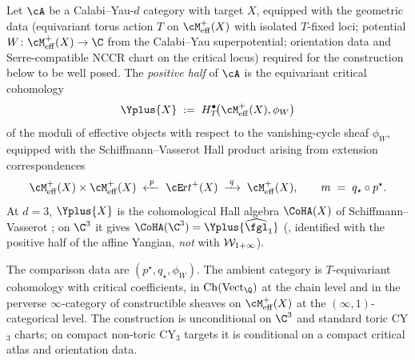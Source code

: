 \begin{definition}
Let $\cA$ be a Calabi--Yau-$d$ category with target $X$, equipped with
the geometric data \textup{(}equivariant torus action $T$ on
$\cM^+_{\mathrm{eff}}(X)$ with isolated $T$-fixed loci; potential $W
\colon \cM^+_{\mathrm{eff}}(X) \to \C$ from the Calabi--Yau
superpotential; orientation data and Serre-compatible NCCR chart on the
critical locus\textup{)} required for the construction below to be
well posed. The \emph{positive half} of $\cA$ is the equivariant
critical cohomology
\[
 \Yplus{X} \;:=\; H^\bullet_{T}\!\bigl(\cM^+_{\mathrm{eff}}(X),
 \phi_W\bigr)
\]
of the moduli of effective objects with respect to the vanishing-cycle
sheaf $\phi_W$, equipped with the Schiffmann--Vasserot Hall product
arising from extension correspondences
\[
 \cM^+_{\mathrm{eff}}(X) \times \cM^+_{\mathrm{eff}}(X)
 \;\xleftarrow{\;p\;}\;
 \cE\!xt^+(X)
 \;\xrightarrow{\;q\;}\;
 \cM^+_{\mathrm{eff}}(X),
 \qquad
 m \;=\; q_\star \circ p^\star.
\]
At $d = 3$, $\Yplus{X}$ is the cohomological Hall algebra
$\CoHA(X)$ of Schiffmann--Vasserot \cite{SchiffmannVasserot2013}; on
$\C^3$ it gives $\CoHA(\C^3) = \Yplus{\widehat{\fgl}_1}$
\textup{(}\cite{SchiffmannVasserot2013}, identified with the positive
half of the affine Yangian, \emph{not} with $\mathcal{W}_{1+\infty}$\textup{)}.

The comparison data are $(p^\star,q_\star,\phi_W)$. The ambient category is
$T$-equivariant cohomology with critical coefficients, in
$\mathrm{Ch}(\mathrm{Vect}_\Q)$ at the chain level and in the perverse
$\infty$-category of constructible sheaves on
$\cM^+_{\mathrm{eff}}(X)$ at the $(\infty,1)$-categorical level. The construction is
unconditional on $\C^3$ and standard toric CY$_3$ charts; on compact
non-toric CY$_3$ targets it is conditional on a compact critical atlas
and orientation data.
\end{definition}

